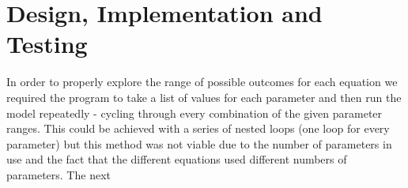 

\chapter{Design, Implementation and Testing}

In order to properly explore the range of possible outcomes for each equation we required the program to take a list of values for each parameter and then run the model repeatedly - cycling through every combination of the given parameter ranges. This could be achieved with a series of nested loops (one loop for every parameter) but this method was not viable due to the number of parameters in use and the fact that the different equations used different numbers of parameters. The next 